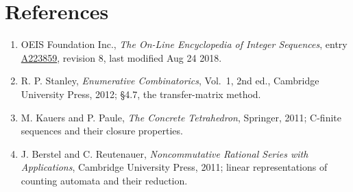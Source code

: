 \documentclass[11pt]{article}
\theoremstyle{definition}
\begin{document}
\section{References}

\begin{enumerate}

\item OEIS Foundation Inc., \emph{The On-Line Encyclopedia of Integer Sequences}, entry \href{https://oeis.org/A223859}{A223859}, revision 8, last modified Aug 24 2018.

\item R. P. Stanley, \emph{Enumerative Combinatorics}, Vol.~1, 2nd ed., Cambridge University Press, 2012; \S4.7, the transfer-matrix method.

\item M. Kauers and P. Paule, \emph{The Concrete Tetrahedron}, Springer, 2011; C-finite sequences and their closure properties.

\item J. Berstel and C. Reutenauer, \emph{Noncommutative Rational Series with Applications}, Cambridge University Press, 2011; linear representations of counting automata and their reduction.

\end{enumerate}
\end{document}
